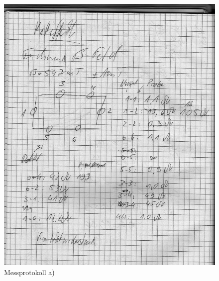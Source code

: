 \begin{figure}
 \centering
 \includegraphics[width=\textwidth]{../data/01.png}
 \caption{Messprotokoll a)}
\end{figure}
